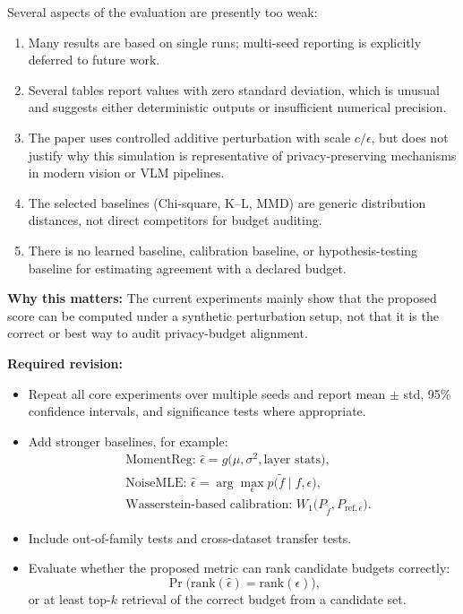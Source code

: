 Several aspects of the evaluation are presently too weak:
\begin{enumerate}
    \item Many results are based on single runs; multi-seed reporting is explicitly deferred to future work.
    \item Several tables report values with zero standard deviation, which is unusual and suggests either deterministic outputs or insufficient numerical precision.
    \item The paper uses controlled additive perturbation with scale $c/\epsilon$, but does not justify why this simulation is representative of privacy-preserving mechanisms in modern vision or VLM pipelines.
    \item The selected baselines (Chi-square, K--L, MMD) are generic distribution distances, not direct competitors for budget auditing.
    \item There is no learned baseline, calibration baseline, or hypothesis-testing baseline for estimating agreement with a declared budget.
\end{enumerate}

\textbf{Why this matters:} The current experiments mainly show that the proposed score can be computed under a synthetic perturbation setup, not that it is the correct or best way to audit privacy-budget alignment.

\textbf{Required revision:}
\begin{itemize}
    \item Repeat all core experiments over multiple seeds and report mean $\pm$ std, 95\% confidence intervals, and significance tests where appropriate.
    \item Add stronger baselines, for example:
    \begin{align}
    &\text{MomentReg: } \hat{\epsilon} = g\big(\mu, \sigma^2, \text{layer stats}\big), \\
    &\text{NoiseMLE: } \hat{\epsilon} = \arg\max_{\epsilon} p\big(\tilde{f} \mid f, \epsilon\big), \\
    &\text{Wasserstein-based calibration: } W_1\big(P_{\tilde{f}}, P_{\mathrm{ref},\epsilon}\big).
    \end{align}
    \item Include out-of-family tests and cross-dataset transfer tests.
    \item Evaluate whether the proposed metric can rank candidate budgets correctly:
    \begin{equation}
    \Pr\Big(\mathrm{rank}(\hat{\epsilon}) = \mathrm{rank}(\epsilon)\Big),
    \end{equation}
    or at least top-$k$ retrieval of the correct budget from a candidate set.
\end{itemize}

